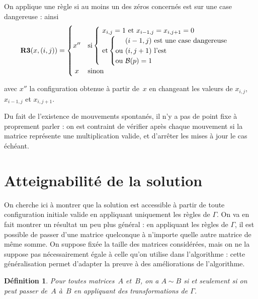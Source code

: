 \documentclass[11pt, openany, a4paper]{article}
\newtheorem*{df*}{ \textbf{Définition}}{}
\begin{document}
On applique une règle si au moins un des zéros concernés est sur une case dangereuse : ainsi \[
\textbf{R3}(x,(i,j))=
\begin{cases}
  \hfill x'' \hfill & \text {si} \begin{cases}\text{ $x_{i,j}=1$ et $x_{i-1,j}=x_{i,j+1}=0$} \\
    \text{ et} \left\{
        \begin{tabular}{@{}c@{}l}
          &\text{ $(i-1,j)$ est une case dangereuse}\\
          \text {ou}& \text{ $(i,j+1)$ l'est}\\
          \text {ou}& \text{ $\mathcal{B}(p)=1$}\\
        \end{tabular}
      \right.
    \end{cases}
  \\
  \hfill x \hfill & \text {sinon}
\end{cases}
\]

avec $x''$ la configuration obtenue à partir de~$x$ en changeant les valeurs de $x_{i,j}$, $x_{i-1,j}$ et $x_{i,j+1}$.

\medskip

Du fait de l'existence de mouvements spontanés, il n'y a pas de point fixe à proprement parler : on est contraint de vérifier après chaque mouvement si la matrice représente une multiplication valide, et d'arrêter les mises à jour le cas échéant. 

\section{Atteignabilité de la solution}

On cherche ici à montrer que la solution est accessible à partir de toute configuration initiale valide en appliquant uniquement les règles de $\Gamma$. On va en fait montrer un résultat un peu plus général : en appliquant les règles de $\Gamma$, il est possible de passer d'une matrice quelconque à n'importe quelle autre matrice de même somme. On suppose fixée la taille des matrices considérées, mais on ne la suppose pas nécessairement égale à celle qu'on utilise dans l'algorithme : cette généralisation permet d'adapter la preuve à des améliorations de l'algorithme.

\begin{df*}
Pour toutes matrices~$A$ et~$B$, on a $A\sim B$ si et seulement si on peut passer de~$A$ à~$B$ en appliquant des transformations de $\Gamma$.
\end{df*}
\end{document}
